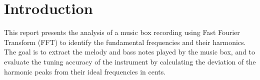 \chapter{Introduction}

This report presents the analysis of a music box recording using Fast Fourier Transform (FFT) to identify the fundamental frequencies and their harmonics. The goal is to extract the melody and bass notes played by the music box, and to evaluate the tuning accuracy of the instrument by calculating the deviation of the harmonic peaks from their ideal frequencies in cents.

